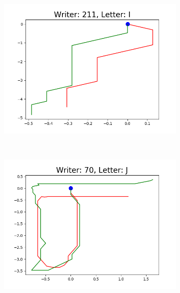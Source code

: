 \begin{figure}
\begin{subfigure}[b]{0.17\textwidth}
          \includegraphics[width=\textwidth]{images/framework/comparison_figures/I_211.png}
      \end{subfigure}
      ~
      \begin{subfigure}[b]{0.17\textwidth}
          \includegraphics[width=\textwidth]{images/framework/comparison_figures/J_70.png}
      \end{subfigure}
      ~
      \begin{subfigure}[b]{0.17\textwidth}

\end{subfigure}
\end{figure}

